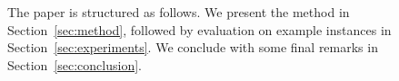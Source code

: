 \documentclass{article}
\begin{document}
The paper is structured as follows. We present the method in Section~\ref{sec:method}, followed by evaluation on example instances  in Section~\ref{sec:experiments}. We conclude with some final remarks in Section~\ref{sec:conclusion}.



\end{document}
